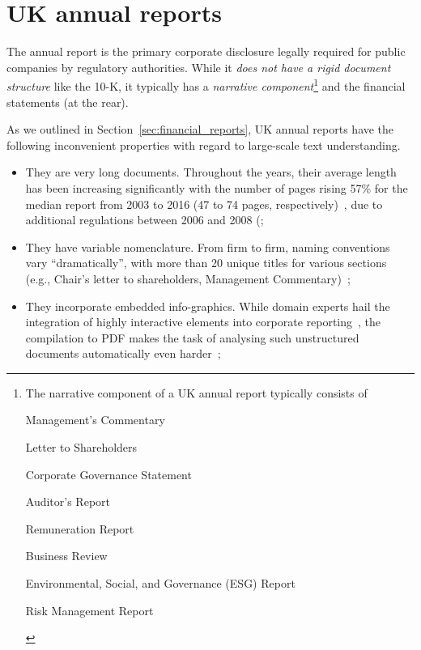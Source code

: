 \section{UK annual reports}\label{sec:uk-annual-reports}
The annual report is the primary corporate disclosure legally required for public companies by regulatory authorities.
While it \emph{does not have a rigid document structure} like the 10-K, it typically has a \emph{narrative component}\footnote{The narrative component of a UK annual report typically consists of
\begin{enumerate*}
    \item Management's Commentary
    \item Letter to Shareholders
    \item Corporate Governance Statement
    \item Auditor's Report
    \item Remuneration Report
    \item Business Review
    \item Environmental, Social, and Governance (ESG) Report
    \item Risk Management Report
\end{enumerate*}
} and the financial statements (at the rear).

As we outlined in Section~\ref{sec:financial_reports}, UK annual reports have the following inconvenient properties with regard to large-scale text understanding.
\begin{itemize}
    \item They are very long documents.
    Throughout the years, their average length has been increasing significantly with the number of pages rising 57\% for the median report from 2003 to 2016 (47 to 74 pages, respectively)~\cite{lewis_young_2019}, due to additional regulations between 2006 and 2008 (\cite{el-haj2019retrieving};
    \item They have variable nomenclature.
    From firm to firm, naming conventions vary \enquote{dramatically}, with more than 20 unique titles for various sections (e.g., Chair's letter to shareholders, Management Commentary)~\cite{lewis_young_2019};
    \item They incorporate embedded info-graphics.
    While domain experts hail the integration of highly interactive elements into corporate reporting~\cite{kriz2016future}, the compilation to PDF makes the task of analysing such unstructured documents automatically even harder~\cite{lewis_young_2019};
\end{itemize}

